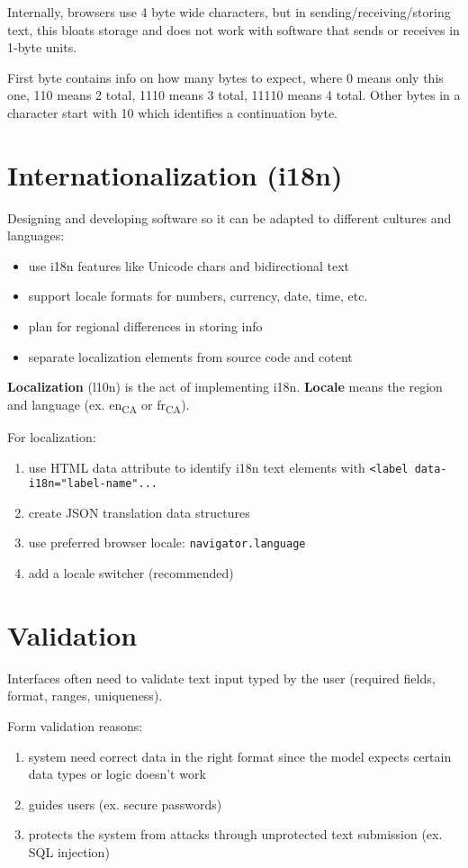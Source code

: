 \documentclass[11pt]{article}
\begin{document}
Internally, browsers use 4 byte wide characters, but in sending/receiving/storing text, this bloats
storage and does not work with software that sends or receives in 1-byte units.

First byte contains info on how many bytes to expect, where 0 means only this one, 110 means 2 total,
1110 means 3 total, 11110 means 4 total.
Other bytes in a character start with 10 which identifies a continuation byte.
\section{Internationalization (i18n)}
\label{sec:org56d6c4a}
Designing and developing software so it can be adapted to different cultures and languages:
\begin{itemize}
\item use i18n features like Unicode chars and bidirectional text
\item support locale formats for numbers, currency, date, time, etc.
\item plan for regional differences in storing info
\item separate localization elements from source code and cotent
\end{itemize}

\textbf{Localization} (l10n) is the act of implementing i18n.
\textbf{Locale} means the region and language (ex. en\textsubscript{CA} or fr\textsubscript{CA}).

For localization:
\begin{enumerate}
\item use HTML data attribute to identify i18n text elements with
\texttt{<label data-i18n="label-name"...}
\item create JSON translation data structures
\item use preferred browser locale: \texttt{navigator.language}
\item add a locale switcher (recommended)
\end{enumerate}
\section{Validation}
\label{sec:org810e57e}
Interfaces often need to validate text input typed by the user (required fields, format, ranges,
uniqueness).

Form validation reasons:
\begin{enumerate}
\item system need correct data in the right format since the model expects certain data types or logic
doesn't work
\item guides users (ex. secure passwords)
\item protects the system from attacks through unprotected text submission (ex. SQL injection)
\end{enumerate}
\end{document}
